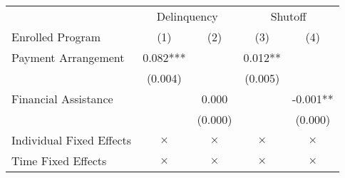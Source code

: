 \begin{tabular}{lcccc}
\toprule 
\midrule 
 & \multicolumn{2}{c}{Delinquency} & \multicolumn{2}{c}{Shutoff} \\
 \cmidrule(lr){2-3} \cmidrule(lr){4-5} 
Enrolled Program & (1) & (2) & (3) & (4) \\
\midrule 
Payment Arrangement & 0.082*** &  & 0.012** &  \\
 & (0.004) &  & (0.005) &  \\
Financial Assistance &  & 0.000 &  & -0.001** \\
 &  & (0.000) &  & (0.000) \\
\midrule 
Individual Fixed Effects & $\times$ & $\times$ & $\times$ & $\times$ \\
Time Fixed Effects & $\times$ & $\times$ & $\times$ & $\times$ \\
\midrule 
\bottomrule 
\end{tabular}
